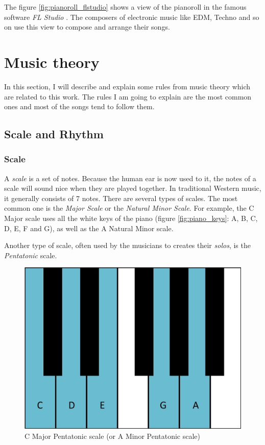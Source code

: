 \documentclass[12pt]{report}
\begin{document}
The figure \ref{fig:pianoroll_flstudio} shows a view of the pianoroll in the famous software \textit{FL Studio} \cite{noauthor_fl_nodate}. The composers of electronic music like EDM, Techno and so on use this view to compose and arrange their songs.


\section{Music theory}
\label{sec:back:music-theory}

In this section, I will describe and explain some rules from music theory which are related to this work.
The rules I am going to explain are the most common ones and most of the songs tend to follow them.

\subsection{Scale and Rhythm}

\subsubsection{Scale}

A \textit{scale} is a set of notes.
Because the human ear is now used to it, the notes of a scale will sound nice when they are played together.
In traditional Western music, it generally consists of 7 notes.
There are several types of scales.
The most common one is the \textit{Major Scale} or the \textit{Natural Minor Scale}.
For example, the C Major scale uses all the white keys of the piano (figure \ref{fig:piano_keys}: A, B, C, D, E, F and G), as well as the A Natural Minor scale.

Another type of scale, often used by the musicians to creates their \textit{solos}, is the \textit{Pentatonic} scale.


\begin{figure}[H]
    \centering
    \includegraphics[width=0.5 \textwidth]{images/music/piano/pentatonic_scale.jpg}
    \caption{C Major Pentatonic scale (or A Minor Pentatonic scale)}
    \label{fig:pentatonic_scale_piano}
\end{figure}
\end{document}

